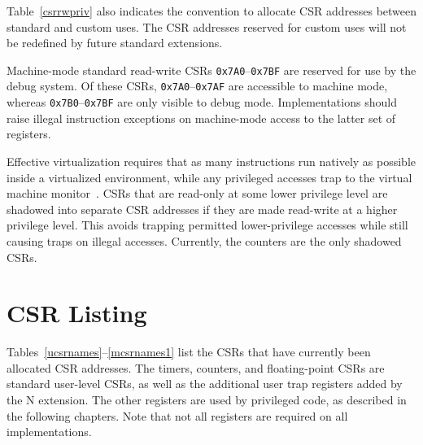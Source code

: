 Table~\ref{csrrwpriv} also indicates the convention to allocate CSR
addresses between standard and custom uses.  The CSR addresses
reserved for custom uses will not be redefined by future
standard extensions.

Machine-mode standard read-write CSRs {\tt 0x7A0}--{\tt 0x7BF} are reserved
for use by the debug system.  Of these CSRs, {\tt 0x7A0}--{\tt 0x7AF} are
accessible to machine mode, whereas {\tt 0x7B0}--{\tt 0x7BF} are only visible
to debug mode.  Implementations should raise illegal instruction exceptions on
machine-mode access to the latter set of registers.

\begin{commentary}
Effective virtualization requires that as many instructions run natively as
possible inside a virtualized environment, while any privileged accesses trap
to the virtual machine monitor~\cite{goldbergvm}.  CSRs that are read-only at
some lower privilege level are shadowed into separate CSR addresses if they
are made read-write at a higher privilege level.  This avoids trapping
permitted lower-privilege accesses while still causing traps on illegal
accesses.  Currently, the counters are the only shadowed CSRs.
\end{commentary}

\section{CSR Listing}

Tables~\ref{ucsrnames}--\ref{mcsrnames1} list the CSRs that have
currently been allocated CSR addresses.  The timers, counters, and
floating-point CSRs are standard user-level CSRs, as well as the
additional user trap registers added by the N extension.  The other
registers are used by privileged code, as described in the following
chapters.  Note that not all registers are required on all
implementations.

